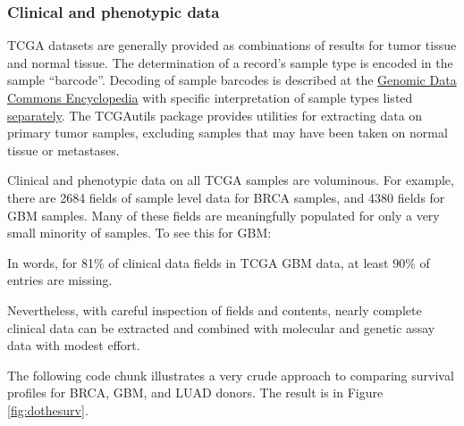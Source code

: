 \hypertarget{clinical-and-phenotypic-data}{%
\subsubsection{Clinical and phenotypic data}\label{clinical-and-phenotypic-data}}

TCGA datasets are generally provided as combinations of
results for tumor tissue and normal tissue. The determination
of a record's sample type is encoded in the sample ``barcode''.
Decoding of sample barcodes is described at the \href{https://docs.gdc.cancer.gov/Encyclopedia/pages/TCGA_Barcode/}{Genomic Data Commons Encyclopedia} with specific interpretation of sample types listed \href{https://gdc.cancer.gov/resources-tcga-users/tcga-code-tables/sample-type-codes}{separately}. The TCGAutils package provides utilities for extracting
data on primary tumor samples, excluding samples that may have been taken on
normal tissue or metastases.

Clinical and phenotypic data on all TCGA samples are voluminous. For example,
there are 2684 fields of sample level data for BRCA
samples, and 4380 fields for GBM samples. Many of these
fields are meaningfully populated for only a very small minority of samples.
To see this for GBM:

\begin{Shaded}
\begin{Highlighting}[]
\NormalTok{(}\NormalTok{(}\NormalTok{(}\OperatorTok{\textgreater{}}\NormalTok{))}
\end{Highlighting}
\end{Shaded}

In words, for 81\% of clinical data fields in TCGA GBM data,
at least 90\% of entries are missing.

Nevertheless, with careful inspection of fields and contents,
nearly complete clinical data can be extracted and combined with molecular
and genetic assay data with modest effort.

The following code chunk illustrates a very crude
approach to comparing survival profiles for BRCA, GBM, and LUAD
donors. The result is in Figure \ref{fig:dothesurv}.

